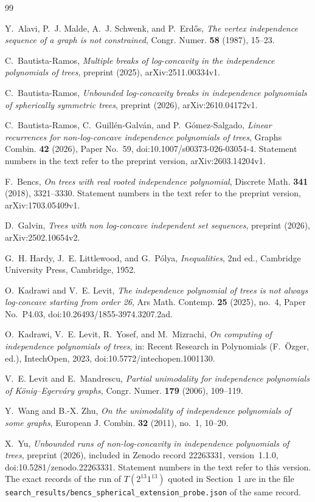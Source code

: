 \documentclass[11pt]{amsart}
\theoremstyle{definition}
\theoremstyle{remark}
\numberwithin{equation}{section}
\begin{document}
\begin{thebibliography}{99}

Y.~Alavi, P.~J. Malde, A.~J. Schwenk, and P.~Erd\H{o}s, \emph{The vertex independence sequence of a graph is not constrained}, Congr. Numer. \textbf{58} (1987), 15--23.

C.~Bautista-Ramos, \emph{Multiple breaks of log-concavity in the independence polynomials of trees}, preprint (2025), arXiv:2511.00334v1.

C.~Bautista-Ramos, \emph{Unbounded log-concavity breaks in independence polynomials of spherically symmetric trees}, preprint (2026), arXiv:2610.04172v1.

C.~Bautista-Ramos, C.~Guill\'en-Galv\'an, and P.~G\'omez-Salgado, \emph{Linear recurrences for non-log-concave independence polynomials of trees}, Graphs Combin. \textbf{42} (2026), Paper No.~59, doi:10.1007/s00373-026-03054-4. Statement numbers in the text refer to the preprint version, arXiv:2603.14204v1.

F.~Bencs, \emph{On trees with real rooted independence polynomial}, Discrete Math. \textbf{341} (2018), 3321--3330. Statement numbers in the text refer to the preprint version, arXiv:1703.05409v1.

D.~Galvin, \emph{Trees with non log-concave independent set sequences}, preprint (2026), arXiv:2502.10654v2.

G.~H. Hardy, J.~E. Littlewood, and G.~P\'olya, \emph{Inequalities}, 2nd ed., Cambridge University Press, Cambridge, 1952.

O.~Kadrawi and V.~E. Levit, \emph{The independence polynomial of trees is not always log-concave starting from order 26}, Ars Math. Contemp. \textbf{25} (2025), no.~4, Paper No.~P4.03, doi:10.26493/1855-3974.3207.2ad.

O.~Kadrawi, V.~E. Levit, R.~Yosef, and M.~Mizrachi, \emph{On computing of independence polynomials of trees}, in: Recent Research in Polynomials (F.~\"Ozger, ed.), IntechOpen, 2023, doi:10.5772/intechopen.1001130.

V.~E. Levit and E.~Mandrescu, \emph{Partial unimodality for independence polynomials of K\"onig--Egerv\'ary graphs}, Congr. Numer. \textbf{179} (2006), 109--119.

Y.~Wang and B.-X. Zhu, \emph{On the unimodality of independence polynomials of some graphs}, European J. Combin. \textbf{32} (2011), no.~1, 10--20.

X.~Yu, \emph{Unbounded runs of non-log-concavity in independence polynomials of trees}, preprint (2026), included in Zenodo record 22263331, version~1.1.0, doi:10.5281/zenodo.22263331. Statement numbers in the text refer to this version. The exact records of the run of $T(2^{13}1^{13})$ quoted in Section~1 are in the file \nolinkurl{search_results/bencs_spherical_extension_probe.json} of the same record.

\end{thebibliography}
\end{document}
